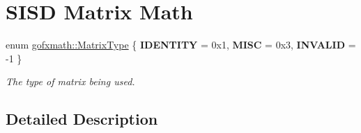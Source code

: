 \hypertarget{group___s_i_s_d_mat_math}{}\section{S\+I\+S\+D Matrix Math}
\label{group___s_i_s_d_mat_math}
\begin{DoxyCompactItemize}
\item 
\hypertarget{group___s_i_s_d_mat_math_ga0434ae8f7ee0d8d40277184552eebef4}{}enum \hyperlink{group___s_i_s_d_mat_math_ga0434ae8f7ee0d8d40277184552eebef4}{gofxmath\+::\+Matrix\+Type} \{ {\bfseries I\+D\+E\+N\+T\+I\+T\+Y} = 0x1, 
{\bfseries M\+I\+S\+C} = 0x3, 
{\bfseries I\+N\+V\+A\+L\+I\+D} = -\/1
 \}\label{group___s_i_s_d_mat_math_ga0434ae8f7ee0d8d40277184552eebef4}

\begin{DoxyCompactList}\small\item\em The type of matrix being used. \end{DoxyCompactList}\end{DoxyCompactItemize}


\subsection{Detailed Description}
